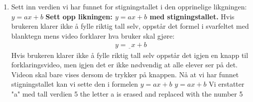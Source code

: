 \documentclass[12pt,twoside,onecolumn]{article}
\begin{document}
\begin{Exercise}
\begin{enumerate}
\item Sett inn verdien vi har funnet for stigningstallet i den opprinelige likgningen: $y = ax + b$ 
\newline
\textbf{Sett opp likningen: $y = ax + b$ med stigningstallet.}
\newline
{\color{Maroon} Hvis brukeren klarer ikke å fylle riktig tall selv, oppstår det formel i svarfeltet med blanktegn mens video forklarer hva bruker skal gjøre: 
\begin{align}
y = \underline{\phantom{0}}x + b
\end{align}}
{\color{Maroon}  Hvis brukeren klarer ikke å fylle riktig tall selv oppstår det igjen en knapp til  forklaringsvideo, men igjen det er ikke nødvendig at alle elever ser på det. Videon skal bare vises  dersom de trykker på knappen.}
\newline
\newline
{\color{gray} Nå at vi har funnet stigningstallet kan vi sette den i formelen  $y = ax + b$ } \newline
{\color{PineGreen} $y = ax + b$  } \newline
{\color{gray}Vi erstatter "a" med tall verdien 5 } \newline
{\color{PineGreen} the letter a is erased and replaced with the number 5 }


\end{enumerate}
\end{Exercise}
\end{document}

